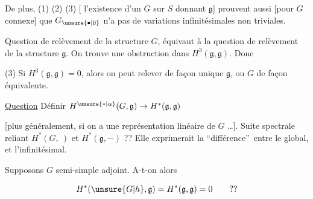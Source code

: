 
De plus, (1) (2) (3) [ l'existence d'un \(G\)  sur \(S\) donnant \(\mathfrak g\)] prouvent aussi [pour \(G\) connexe] que \(G_{\unsure{\bullet|0}}\) n'a pas de variations infinitésimales non triviales.

Question de relèvement de la structure \(G\), équivaut à la question de relèvement de la structure \(\mathfrak g\). On trouve une obstruction dans \(H^3(\mathfrak g,\mathfrak g)\). Donc


(3) Si \(H^3(\mathfrak g,\mathfrak g)=0\), alors on peut relever de façon  unique \(\mathfrak g\), ou \(G\) de façon équivalente.

\uline{Question} Définir \(H^{\unsure{*|\alpha}}(G,\mathfrak g)\to H^*(\mathfrak g,\mathfrak g)\)

[plus généralement, si on a une représentation linéaire de \(G\) \ldots]. Suite spectrale reliant \(H^*(G,\ )\) et \(H^*(\mathfrak g,-)\) ?? Elle exprimerait la \textquotedblleft différence\textquotedblright\ entre le global, et l'infinitésimal.

Supposons \(G\) semi-simple adjoint. A-t-on alors

\[
H^*(\unsure{G|h},\mathfrak g)=H^*(\mathfrak g,\mathfrak g)=0\qquad ??
\]
